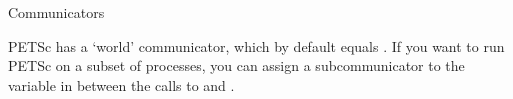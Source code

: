 
 {Communicators}

PETSc has a `world' communicator, which by default equals
. If you want to run PETSc on a subset of processes,
you can assign a subcommunicator to the variable 
in between the calls to  and
.
%
